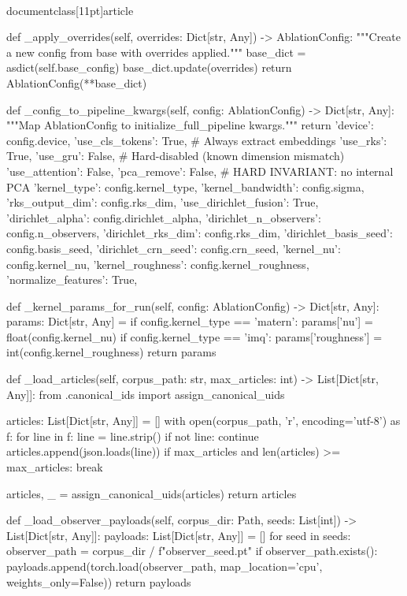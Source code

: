 \\documentclass[11pt]{article}
\begin{document}
\begin{CodeBlock}
    def _apply_overrides(self, overrides: Dict[str, Any]) -> AblationConfig:
        """Create a new config from base with overrides applied."""
        base_dict = asdict(self.base_config)
        base_dict.update(overrides)
        return AblationConfig(**base_dict)

    def _config_to_pipeline_kwargs(self, config: AblationConfig) -> Dict[str, Any]:
        """Map AblationConfig to initialize_full_pipeline kwargs."""
        return {
            'device': config.device,
            'use_cls_tokens': True,  # Always extract embeddings
            'use_rks': True,
            'use_gru': False,  # Hard-disabled (known dimension mismatch)
            'use_attention': False,
            'pca_remove': False,  # HARD INVARIANT: no internal PCA
            'kernel_type': config.kernel_type,
            'kernel_bandwidth': config.sigma,
            'rks_output_dim': config.rks_dim,
            'use_dirichlet_fusion': True,
            'dirichlet_alpha': config.dirichlet_alpha,
            'dirichlet_n_observers': config.n_observers,
            'dirichlet_rks_dim': config.rks_dim,
            'dirichlet_basis_seed': config.basis_seed,
            'dirichlet_crn_seed': config.crn_seed,
            'kernel_nu': config.kernel_nu,
            'kernel_roughness': config.kernel_roughness,
            'normalize_features': True,
        }

    def _kernel_params_for_run(self, config: AblationConfig) -> Dict[str, Any]:
        params: Dict[str, Any] = {}
        if config.kernel_type == 'matern':
            params['nu'] = float(config.kernel_nu)
        if config.kernel_type == 'imq':
            params['roughness'] = int(config.kernel_roughness)
        return params

    def _load_articles(self, corpus_path: str, max_articles: int) -> List[Dict[str, Any]]:
        from .canonical_ids import assign_canonical_uids

        articles: List[Dict[str, Any]] = []
        with open(corpus_path, 'r', encoding='utf-8') as f:
            for line in f:
                line = line.strip()
                if not line:
                    continue
                articles.append(json.loads(line))
                if max_articles and len(articles) >= max_articles:
                    break

        articles, _ = assign_canonical_uids(articles)
        return articles

    def _load_observer_payloads(self, corpus_dir: Path, seeds: List[int]) -> List[Dict[str, Any]]:
        payloads: List[Dict[str, Any]] = []
        for seed in seeds:
            observer_path = corpus_dir / f"observer_{seed}.pt"
            if observer_path.exists():
                payloads.append(torch.load(observer_path, map_location='cpu', weights_only=False))
        return payloads


\end{CodeBlock}
\end{document}
